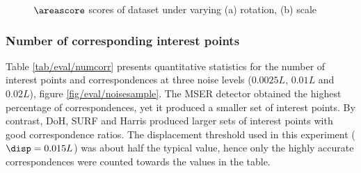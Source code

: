 \begin{figure}[ht]
\begin{subfigure}[t]{0.48\linewidth}
		\label{fig/eval/graph_scaling}
	\end{subfigure}
	\caption{$\areascore$ scores of \meshset dataset under varying (a) rotation, (b) scale}
	\label{fig/eval/graph_graph1} 
\end{figure}

\subsubsection{Number of corresponding interest points}

Table \ref{tab/eval/numcorr} presents quantitative statistics for the number of interest points and correspondences at three noise levels ($0.0025L$, $0.01L$ and $0.02L$), \cf figure \ref{fig/eval/noisesample}.
The MSER detector obtained the highest percentage of correspondences, yet it produced a smaller set of interest points. By contrast, DoH, SURF and Harris produced larger sets of interest points with good correspondence ratios. The displacement threshold used in this experiment ($\disp = 0.015L$) was about half the typical value, hence only the highly accurate correspondences were counted towards the values in the table. 

